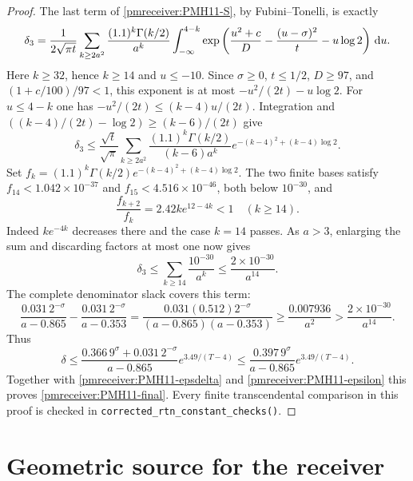 \begin{proof}
The last term of \eqref{pmreceiver:PMH11-S}, by Fubini--Tonelli, is exactly
\[
 \delta_3=\frac1{2\sqrt{\pi t}}
 \sum_{k\ge2a^2}\frac{(1.1)^k\Gamma(k/2)}{a^k}
 \int_{-\infty}^{4-k}
 \exp\left(\frac{u^2+c}{D}-\frac{(u-\sigma)^2}{t}
                          -u\log2\right)\,\mathrm d u.
\]
Here $k\ge32$, hence $k\ge14$ and $u\le-10$. Since
$\sigma\ge0$, $t\le1/2$, $D\ge97$, and
$(1+c/100)/97<1$, this exponent is at most
$-u^2/(2t)-u\log2$. For $u\le4-k$ one has
$-u^2/(2t)\le(k-4)u/(2t)$. Integration and
$((k-4)/(2t)-\log2)\ge(k-6)/(2t)$ give
\[
 \delta_3\le\frac{\sqrt t}{\sqrt\pi}
 \sum_{k\ge2a^2}\frac{(1.1)^k\Gamma(k/2)}{(k-6)a^k}
            e^{-(k-4)^2+(k-4)\log2}.
\]
Set $f_k=(1.1)^k\Gamma(k/2)e^{-(k-4)^2+(k-4)\log2}$.
The two finite bases satisfy $f_{14}<1.042\times10^{-37}$ and
$f_{15}<4.516\times10^{-46}$, both below $10^{-30}$, and
\[
 \frac{f_{k+2}}{f_k}=2.42k e^{12-4k}<1\quad(k\ge14).
\]
Indeed $k e^{-4k}$ decreases there and the case $k=14$ passes.
As $a>3$, enlarging the sum and discarding factors at most one
now gives
\begin{equation}\label{pmreceiver:PMH11-delta3}
 \delta_3\le\sum_{k\ge14}\frac{10^{-30}}{a^k}
       \le\frac{2\times10^{-30}}{a^{14}}.
\end{equation}
The complete denominator slack covers this term:
\[
 \frac{0.031\,2^{-\sigma}}{a-0.865}
 -\frac{0.031\,2^{-\sigma}}{a-0.353}
 =\frac{0.031(0.512)2^{-\sigma}}{(a-0.865)(a-0.353)}
 \ge\frac{0.007936}{a^2}
 >\frac{2\times10^{-30}}{a^{14}}.
\]
Thus
\[
 \delta\le\frac{0.366\,9^\sigma+0.031\,2^{-\sigma}}
                  {a-0.865}e^{3.49/(T-4)}
 \le\frac{0.397\,9^\sigma}{a-0.865}e^{3.49/(T-4)}.
\]
Together with \eqref{pmreceiver:PMH11-epsdelta} and \eqref{pmreceiver:PMH11-epsilon}
this proves \eqref{pmreceiver:PMH11-final}. Every finite transcendental
comparison in this proof is checked in
\texttt{corrected\_rtn\_constant\_checks()}.
\end{proof}


\section{Geometric source for the receiver}

